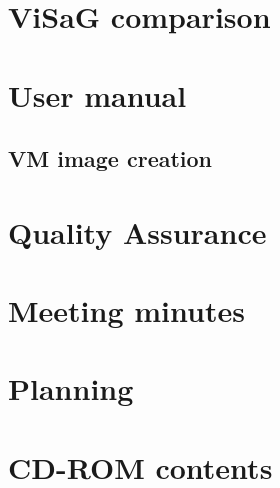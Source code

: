 \documentclass[11pt,a4paper,twoside,onecolumn,english]{book}
\begin{document}
\titlespacing{\section}{0pt}{2mm}{-2mm}
\titlespacing{\subsection}{0pt}{1mm}{-3mm}





\cleardoublepage
{}








\cleardoublepage
{}
\label{sec:glossary}
\printglossary[type=main]

\cleardoublepage
{}
\label{sec:acronyms}
\printglossary[type=\acronymtype]

\cleardoublepage
{}
\label{sec:references}
\printbibliography[title=References]

\appendix

\chapter{ViSaG comparison}
\chapter{User manual}
\section{VM image creation}
\chapter{Quality Assurance}
\chapter{Meeting minutes}
\chapter{Planning}
\chapter{CD-ROM contents}
\end{document}
